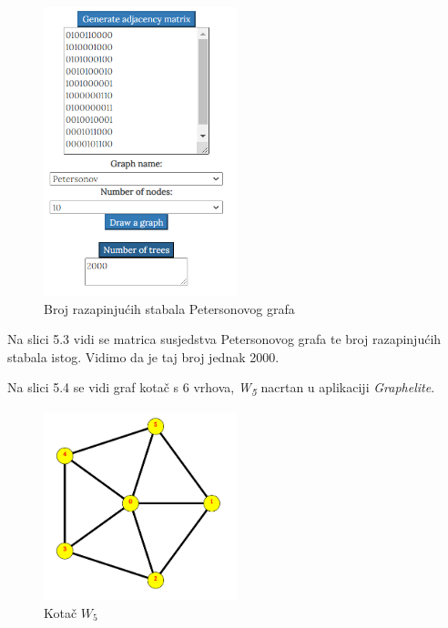 \documentclass[times, utf8, zavrsni]{fer}
\begin{document}
\begin{figure}[htb]
	\centering
	\includegraphics[width=0.5\textwidth]{slike/petersonovbroj.png}
	\caption{Broj razapinjućih stabala Petersonovog grafa}
	\label{fig:petersonov-broj}
\end{figure}

Na slici 5.3 vidi se matrica susjedstva Petersonovog grafa te broj razapinjućih stabala istog. Vidimo da je taj broj jednak 2000.

Na slici 5.4 se vidi graf kotač s 6 vrhova, \textit{W\textsubscript{5}} nacrtan u aplikaciji \textit{Graphelite}.

\begin{figure}[htb]
	\centering
	\includegraphics[width=0.5\textwidth]{slike/kotac2.png}
	\caption{Kotač $W_5$}
	\label{fig:kotac}
\end{figure}
\end{document}

